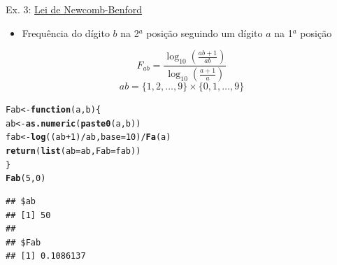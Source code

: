 \documentclass{beamer}\usepackage[]{graphicx}\usepackage[]{xcolor}
\makeatletter
\newcommand{\hlnum}[1]{\textcolor[rgb]{0.686,0.059,0.569}{#1}}%
\newcommand{\hlopt}[1]{\textcolor[rgb]{0,0,0}{#1}}%
\newcommand{\hldef}[1]{\textcolor[rgb]{0.345,0.345,0.345}{#1}}%
\newcommand{\hlkwa}[1]{\textcolor[rgb]{0.161,0.373,0.58}{\textbf{#1}}}%
\newcommand{\hlkwb}[1]{\textcolor[rgb]{0.69,0.353,0.396}{#1}}%
\newcommand{\hlkwc}[1]{\textcolor[rgb]{0.333,0.667,0.333}{#1}}%
\newcommand{\hlkwd}[1]{\textcolor[rgb]{0.737,0.353,0.396}{\textbf{#1}}}%
\newenvironment{kframe}{%
 \def\at@end@of@kframe{}%
 \ifinner\ifhmode%
  \def\at@end@of@kframe{\end{minipage}}%
  \begin{minipage}{\columnwidth}%
 \fi\fi%
 \def\FrameCommand##1{\hskip\@totalleftmargin \hskip-\fboxsep
 \colorbox{shadecolor}{##1}\hskip-\fboxsep
     \hskip-\linewidth \hskip-\@totalleftmargin \hskip\columnwidth}%
 \MakeFramed {\advance\hsize-\width
   \@totalleftmargin\z@ \linewidth\hsize
   \@setminipage}}%
 {\par\unskip\endMakeFramed%
 \at@end@of@kframe}
\newenvironment{knitrout}{}{} %
\makeatother
\begin{document}
\begin{frame}[fragile]{Ex. 3: \href{https://en.wikipedia.org/wiki/Benford\%27s_law}{Lei de Newcomb-Benford}}
 \begin{itemize}
    \item Frequência do dígito $b$ na 2$^a$ posição seguindo um dígito $a$ na 1$^a$ posição
  \end{itemize}
  \[F_{ab} = \frac{\log_{10} \left( \frac{ab+1}{ab} \right)}{\log_{10} \left( \frac{a+1}{a} \right)} \]
  \[ab = \{1,2,\ldots,9\} \times \{0,1,\ldots,9\}\]
\fontsize{8pt}{8pt}\selectfont
\begin{knitrout}
\color{fgcolor}\begin{kframe}
\begin{alltt}
\hldef{Fab} \hlkwb{<-} \hlkwa{function}\hldef{(}\hlkwc{a}\hldef{,}\hlkwc{b}\hldef{)\{}
  \hldef{ab} \hlkwb{<-} \hlkwd{as.numeric}\hldef{(}\hlkwd{paste0}\hldef{(a,b))}
  \hldef{fab} \hlkwb{<-} \hlkwd{log}\hldef{((ab}\hlopt{+}\hlnum{1}\hldef{)}\hlopt{/}\hldef{ab,} \hlkwc{base} \hldef{=} \hlnum{10}\hldef{)}\hlopt{/}\hlkwd{Fa}\hldef{(a)}
  \hlkwd{return}\hldef{(}\hlkwd{list}\hldef{(}\hlkwc{ab}\hldef{=ab,} \hlkwc{Fab}\hldef{=fab))}
\hldef{\}}
\hlkwd{Fab}\hldef{(}\hlnum{5}\hldef{,}\hlnum{0}\hldef{)}
\end{alltt}
\begin{verbatim}
## $ab
## [1] 50
## 
## $Fab
## [1] 0.1086137
\end{verbatim}
\end{kframe}
\end{knitrout}
\end{frame}
\end{document}
